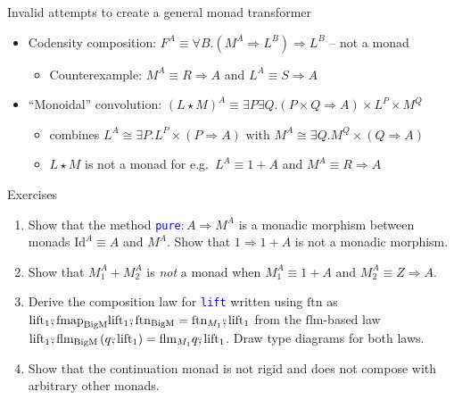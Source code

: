 \documentclass[english]{beamer}
\newcommand{\bef}{\ensuremath\raisebox{2pt}{$\mathsmaller{\mathsmaller{\circ}}$}\hspace{-3.3pt},}
\begin{document}
\begin{frame}{Invalid attempts to create a general monad transformer}
\begin{itemize}
\item Codensity composition: $F^{A}\equiv\forall B.\left(M^{A}\Rightarrow L^{B}\right)\Rightarrow L^{B}$
-- not a monad
\begin{itemize}
\item Counterexample: $M^{A}\equiv R\Rightarrow A$ and $L^{A}\equiv S\Rightarrow A$
\end{itemize}
\item ``Monoidal'' convolution: {\small{}$\left(L\star M\right)^{A}\equiv\exists P\exists Q.\left(P\times Q\Rightarrow A\right)\times L^{P}\times M^{Q}$}{\small\par}
\begin{itemize}
\item combines $L^{A}\cong\exists P.L^{P}\times\left(P\Rightarrow A\right)$
with $M^{A}\cong\exists Q.M^{Q}\times\left(Q\Rightarrow A\right)$ 
\item $L\star M$ is not a monad for e.g.~$L^{A}\equiv1+A$ and $M^{A}\equiv R\Rightarrow A$
\end{itemize}
\end{itemize}
\end{frame}

\begin{frame}{Exercises}
\begin{enumerate}
\item {\small{}Show that the method }\texttt{\textcolor{blue}{\footnotesize{}pure}}{\small{}$:A\Rightarrow M^{A}$
is a monadic morphism between monads $\text{Id}^{A}\equiv A$ and
$M^{A}$. Show that $1\Rightarrow1+A$ is not a monadic morphism.}{\small\par}
\item {\small{}Show that $M_{1}^{A}+M_{2}^{A}$ is }\emph{\small{}not}{\small{}
a monad when $M_{1}^{A}\equiv1+A$ and $M_{2}^{A}\equiv Z\Rightarrow A$.}{\small\par}
\item {\small{}Derive the composition law for }\texttt{\textcolor{blue}{\small{}lift}}{\small{}
written using $\text{ftn}$ as $\text{lift}_{1}\bef\text{fmap}_{\text{BigM}}\text{lift}_{1}\bef\text{ftn}_{\text{BigM}}=\text{ftn}_{M_{1}}\bef\text{lift}_{1}$
from the $\text{flm}$-based law $\text{lift}_{1}\bef\text{flm}_{\text{BigM}}\left(q\bef\text{lift}_{1}\right)=\text{flm}_{M_{1}}q\bef\text{lift}_{1}$.
Draw type diagrams for both laws.}{\small\par}
\item {\small{}Show that the continuation monad is not rigid and does not
compose with arbitrary other monads.}{\small\par}
\end{enumerate}
\end{frame}
\end{document}
